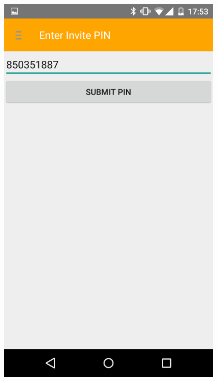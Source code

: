 \begin{figure}[!h]
\centering
\begin{minipage}{.4\textwidth}
  \centering
  \includegraphics[width=.8\linewidth]{abb/bsp/bsp15}
  \label{fig:bsp15}
\end{minipage}
\begin{minipage}{.4\textwidth}
  \centering

\end{minipage}
\end{figure}
